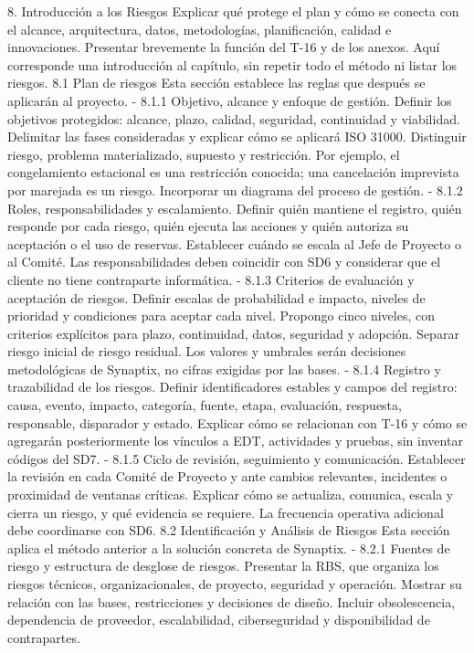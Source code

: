 8. Introducción a los Riesgos
Explicar qué protege el plan y cómo se conecta con el alcance, arquitectura, datos, metodologías, planificación, calidad e innovaciones. Presentar brevemente la función del T-16 y de los anexos. Aquí corresponde una introducción al capítulo, sin repetir todo el método ni listar los riesgos.
8.1 Plan de riesgos
Esta sección establece las reglas que después se aplicarán al proyecto.
- 8.1.1 Objetivo, alcance y enfoque de gestión. Definir los objetivos protegidos: alcance, plazo, calidad, seguridad, continuidad y viabilidad. Delimitar las fases consideradas y explicar cómo se aplicará ISO 31000. Distinguir riesgo, problema materializado, supuesto y restricción. Por ejemplo, el congelamiento estacional es una restricción conocida; una cancelación imprevista por marejada es un riesgo. Incorporar un diagrama del proceso de gestión.
- 8.1.2 Roles, responsabilidades y escalamiento. Definir quién mantiene el registro, quién responde por cada riesgo, quién ejecuta las acciones y quién autoriza su aceptación o el uso de reservas. Establecer cuándo se escala al Jefe de Proyecto o al Comité. Las responsabilidades deben coincidir con SD6 y considerar que el cliente no tiene contraparte informática.
- 8.1.3 Criterios de evaluación y aceptación de riesgos. Definir escalas de probabilidad e impacto, niveles de prioridad y condiciones para aceptar cada nivel. Propongo cinco niveles, con criterios explícitos para plazo, continuidad, datos, seguridad y adopción. Separar riesgo inicial de riesgo residual. Los valores y umbrales serán decisiones metodológicas de Synaptix, no cifras exigidas por las bases.
- 8.1.4 Registro y trazabilidad de los riesgos. Definir identificadores estables y campos del registro: causa, evento, impacto, categoría, fuente, etapa, evaluación, respuesta, responsable, disparador y estado. Explicar cómo se relacionan con T-16 y cómo se agregarán posteriormente los vínculos a EDT, actividades y pruebas, sin inventar códigos del SD7.
- 8.1.5 Ciclo de revisión, seguimiento y comunicación. Establecer la revisión en cada Comité de Proyecto y ante cambios relevantes, incidentes o proximidad de ventanas críticas. Explicar cómo se actualiza, comunica, escala y cierra un riesgo, y qué evidencia se requiere. La frecuencia operativa adicional debe coordinarse con SD6.
8.2 Identificación y Análisis de Riesgos
Esta sección aplica el método anterior a la solución concreta de Synaptix.
- 8.2.1 Fuentes de riesgo y estructura de desglose de riesgos. Presentar la RBS, que organiza los riesgos técnicos, organizacionales, de proyecto, seguridad y operación. Mostrar su relación con las bases, restricciones y decisiones de diseño. Incluir obsolescencia, dependencia de proveedor, escalabilidad, ciberseguridad y disponibilidad de contrapartes.

